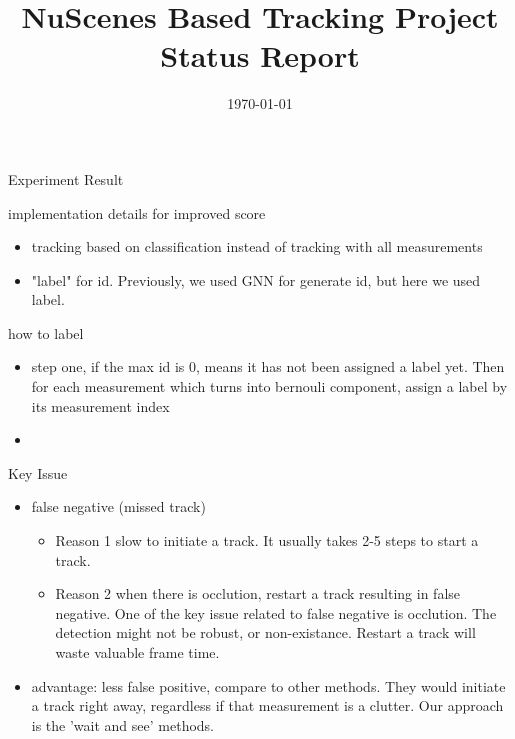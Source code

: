 \documentclass[aspectratio=169,xcolor=dvipsnames]{beamer}
\title{NuScenes Based Tracking Project Status Report} %
\date{\today} %
\begin{document}
\begin{frame}
    \titlepage
\end{frame}

\begin{frame}{Experiment Result}
    \href{https://docs.google.com/spreadsheets/d/e/2PACX-1vQg2MSCst4ShlC0e7T_lr_q4azo-DfDo53On89BjeisHAKJrggMLoTUxcvurpXomLZilYKoWmMMf6U4/pubhtml}{}
\end{frame}

\begin{frame}{implementation details for improved score}
    \begin{itemize}
        \item{tracking based on classification instead of tracking with all measurements}
        \item{"label" for id. Previously, we used GNN for generate id, but here we used label.}
    \end{itemize}
\end{frame}

\begin{frame}{how to label}
    \begin{itemize}
        \item{step one, if the max id is 0, means it has not been assigned a label yet. Then for each measurement which turns into bernouli component, assign a label by its measurement index }
        \item{}
    \end{itemize}
\end{frame}

\begin{frame}{Key Issue}
    \begin{itemize}
        \item{false negative (missed track)}
        \begin{itemize}
            \item{Reason 1 slow to initiate a track. It usually takes 2-5 steps to start a track. }
            \item{Reason 2 when there is occlution, restart a track resulting in false negative. One of the key issue related to false negative is occlution. The detection might not be robust, or non-existance. Restart a track will waste valuable frame time. }
        \end{itemize}
        \item{advantage: less false positive, compare to other methods. They would initiate a track right away, regardless if that measurement is a clutter. Our approach is the 'wait and see' methods.}
    \end{itemize}
\end{frame}
\end{document}
